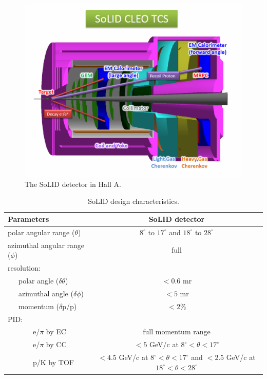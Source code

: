 \begin{figure}[t]
\includegraphics[width=125mm]{SoLID_setup_20130225_TCS_arrow.eps}
\caption{\small{The SoLID detector in Hall A.}}
\label{fig:solid}
\end{figure}

\begin{table}[t]
 \centering
 \begin{tabular}{|l|c|}
\hline
Parameters                                    & SoLID detector \\ 
\hline
polar angular range ($\theta$)       & $8^\circ$ to $17^\circ$ and $18^\circ$ to $28^\circ$  \\ 
azimuthal angular range ($\phi$)   & full  \\ 
resolution: &     \\ 
~~~polar angle ($\delta\theta$)     & $<0.6$ mr  \\ 
~~~azimuthal angle ($\delta\phi$) &$<5$ mr \\ 
~~~momentum ($\delta$p/p)         &$<2\%$ \\ 
\hline
PID: &\\
~~~~~~~e/$\pi$ by EC & full momentum range \\
~~~~~~~e/$\pi$ by CC & $<5$ GeV/c at $8^\circ < \theta <17^\circ$ \\
~~~~~~~p/K by TOF    & $<4.5$ GeV/c at $8^\circ < \theta <17^\circ$ and $<2.5$ GeV/c at $18^\circ < \theta <28^\circ$ \\ 
\hline
\end{tabular}
\caption{SoLID design characteristics.}
\label{table:SoLID}
\end{table}

